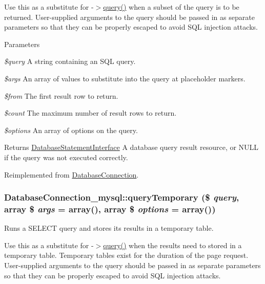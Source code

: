 Use this as a substitute for -\/$>$\hyperlink{classDatabaseConnection_aff564097281c4496e9d10cb1bccbe98d}{query()} when a subset of the query is to be returned. User-\/supplied arguments to the query should be passed in as separate parameters so that they can be properly escaped to avoid SQL injection attacks.


\begin{DoxyParams}{Parameters}
\item[{\em \$query}]A string containing an SQL query. \item[{\em \$args}]An array of values to substitute into the query at placeholder markers. \item[{\em \$from}]The first result row to return. \item[{\em \$count}]The maximum number of result rows to return. \item[{\em \$options}]An array of options on the query.\end{DoxyParams}
\begin{DoxyReturn}{Returns}
\hyperlink{interfaceDatabaseStatementInterface}{DatabaseStatementInterface} A database query result resource, or NULL if the query was not executed correctly. 
\end{DoxyReturn}


Reimplemented from \hyperlink{classDatabaseConnection_a1c97c77517b969270bb92c5c7e022a5d}{DatabaseConnection}.\hypertarget{classDatabaseConnection__mysql_a928309f48ddbeeca25328fec33c4ab9e}{
\subsubsection[{queryTemporary}]{\setlength{\rightskip}{0pt plus 5cm}DatabaseConnection\_\-mysql::queryTemporary (\$ {\em query}, \/  array \$ {\em args} = {\ttfamily array()}, \/  array \$ {\em options} = {\ttfamily array()})}}
\label{classDatabaseConnection__mysql_a928309f48ddbeeca25328fec33c4ab9e}
Runs a SELECT query and stores its results in a temporary table.

Use this as a substitute for -\/$>$\hyperlink{classDatabaseConnection_aff564097281c4496e9d10cb1bccbe98d}{query()} when the results need to stored in a temporary table. Temporary tables exist for the duration of the page request. User-\/supplied arguments to the query should be passed in as separate parameters so that they can be properly escaped to avoid SQL injection attacks.

